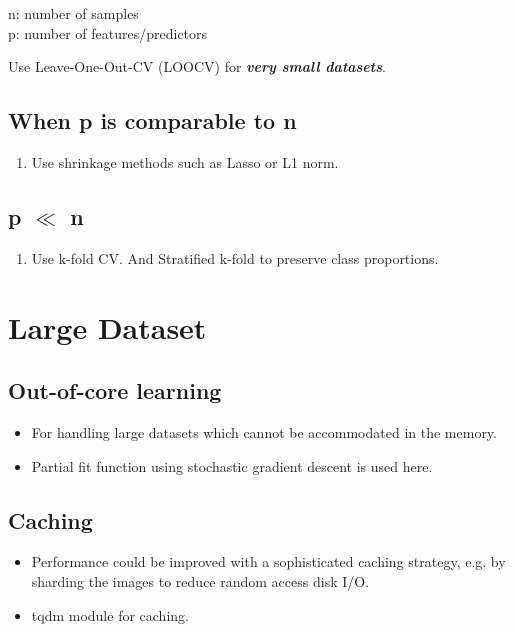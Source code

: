 \documentclass[a4paper, 12pt]{report}
\begin{document}
\label{smalldatasize}
n: number of samples\\
p: number of features/predictors

Use Leave-One-Out-CV (LOOCV) for \textbf{\textit{very small datasets}}.

\subsection{When p is comparable to n}
\begin{enumerate}

\item Use shrinkage methods such as Lasso or L1 norm.

\end{enumerate}


\subsection{p $\ll$ n}
\begin{enumerate}
\item Use k-fold CV. And Stratified k-fold to preserve class proportions.
\end{enumerate}



\section{Large Dataset}

\subsection{Out-of-core learning}
\label{subsec:outofcorelearning}

\begin{itemize}
\item For handling large datasets which cannot be accommodated in the memory.
\item Partial fit function using stochastic gradient descent is used here.

\end{itemize} 

\subsection{Caching}
\begin{itemize}
\item Performance could be improved with a sophisticated caching strategy, e.g. by sharding the images to reduce random access disk I/O. 
\item {\color{cyan} tqdm module} for caching.
\end{itemize}
\end{document}
